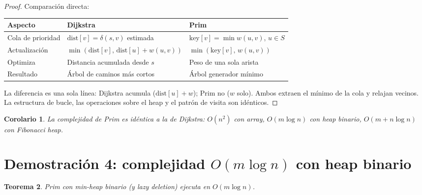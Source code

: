 \documentclass[11pt, letterpaper]{article}
\theoremstyle{definition}
\theoremstyle{plain}
\newtheorem{theorem}{Teorema}[section]
\newtheorem{corollary}[theorem]{Corolario}
\theoremstyle{remark}
\begin{document}
\begin{proof}
Comparación directa:

\begin{table}[h]
\centering
\begin{tabular}{lll}
\toprule
\textbf{Aspecto} & \textbf{Dijkstra} & \textbf{Prim} \\
\midrule
Cola de prioridad
  & $\mathrm{dist}[v] = \delta(s,v)$ estimada
  & $\mathrm{key}[v] = \min w(u,v)$, $u \in S$ \\
Actualización
  & $\min(\mathrm{dist}[v],\, \mathrm{dist}[u]{+}w(u,v))$
  & $\min(\mathrm{key}[v],\, w(u,v))$ \\
Optimiza
  & Distancia acumulada desde $s$
  & Peso de una sola arista \\
Resultado
  & Árbol de caminos más cortos
  & Árbol generador mínimo \\
\bottomrule
\end{tabular}
\end{table}

La diferencia es una sola línea: Dijkstra acumula
($\mathrm{dist}[u] + w$); Prim no ($w$ solo). Ambos extraen el
mínimo de la cola y relajan vecinos. La estructura de bucle, las
operaciones sobre el heap y el patrón de visita son idénticos.
\end{proof}

\begin{corollary}
La complejidad de Prim es idéntica a la de Dijkstra: $O(n^2)$ con
array, $O(m \log n)$ con heap binario, $O(m + n\log n)$ con
Fibonacci heap.
\end{corollary}

\section{Demostración 4: complejidad
  \texorpdfstring{$O(m \log n)$}{O(m log n)} con heap binario}

\begin{theorem}\label{thm:complexity}
Prim con min-heap binario (y lazy deletion) ejecuta en
$O(m \log n)$.
\end{theorem}
\end{document}
